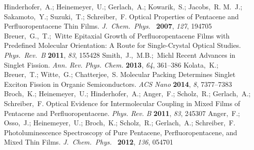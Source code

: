 \documentclass[journal=jpclcd,manuscript=letter]{achemso}
\begin{document}
\begin{mcitethebibliography}{51}
Hinderhofer,~A.; Heinemeyer,~U.; Gerlach,~A.; Kowarik,~S.; Jacobs,~R. M.~J.;
  Sakamoto,~Y.; Suzuki,~T.; Schreiber,~F. Optical Properties of Pentacene and
  Perfluoropentacene Thin Films. \emph{J.~Chem.~Phys.~} \textbf{2007},
  \emph{127}, 194705\relax
\mciteBstWouldAddEndPuncttrue
\mciteSetBstMidEndSepPunct{\mcitedefaultmidpunct}
{\mcitedefaultendpunct}{\mcitedefaultseppunct}\relax
\EndOfBibitem
{}
Breuer,~G.,~T.;~Witte Epitaxial Growth of Perfluoropentacene Films with
  Predefined Molecular Orientation: A Route for Single-Crystal Optical Studies.
  \emph{Phys.~Rev.~B} \textbf{2011}, \emph{83}, 155428\relax
\mciteBstWouldAddEndPuncttrue
\mciteSetBstMidEndSepPunct{\mcitedefaultmidpunct}
{\mcitedefaultendpunct}{\mcitedefaultseppunct}\relax
\EndOfBibitem
{}
Smith,~J.,~M.B.;~Michl Recent Advances in Singlet Fission. \emph{Ann. Rev.
  Phys. Chem.} \textbf{2013}, \emph{64}, 361--386\relax
\mciteBstWouldAddEndPuncttrue
\mciteSetBstMidEndSepPunct{\mcitedefaultmidpunct}
{\mcitedefaultendpunct}{\mcitedefaultseppunct}\relax
\EndOfBibitem
{}
Kolata,~K.; Breuer,~T.; Witte,~G.; Chatterjee,~S. Molecular Packing Determines
  Singlet Exciton Fission in Organic Semiconductors. \emph{ACS Nano}
  \textbf{2014}, \emph{8}, 7377--7383\relax
\mciteBstWouldAddEndPuncttrue
\mciteSetBstMidEndSepPunct{\mcitedefaultmidpunct}
{\mcitedefaultendpunct}{\mcitedefaultseppunct}\relax
\EndOfBibitem
{}
Broch,~K.; Heinemeyer,~U.; Hinderhofer,~A.; Anger,~F.; Scholz,~R.; Gerlach,~A.;
  Schreiber,~F. Optical Evidence for Intermolecular Coupling in Mixed Films of
  Pentacene and Perfluoropentacene. \emph{Phys. Rev. B} \textbf{2011},
  \emph{83}, 245307\relax
\mciteBstWouldAddEndPuncttrue
\mciteSetBstMidEndSepPunct{\mcitedefaultmidpunct}
{\mcitedefaultendpunct}{\mcitedefaultseppunct}\relax
\EndOfBibitem
{}
Anger,~F.; Osso,~J.; Heinemeyer,~U.; Broch,~K.; Scholz,~R.; Gerlach,~A.;
  Schreiber,~F. Photoluminescence Spectroscopy of Pure Pentacene,
  Perfluoropentacene, and Mixed Thin Films. \emph{J.~Chem.~Phys.~}
  \textbf{2012}, \emph{136}, 054701\relax
\mciteBstWouldAddEndPuncttrue
\mciteSetBstMidEndSepPunct{\mcitedefaultmidpunct}
{\mcitedefaultendpunct}{\mcitedefaultseppunct}\relax
\EndOfBibitem
{}

\end{mcitethebibliography}
\end{document}
